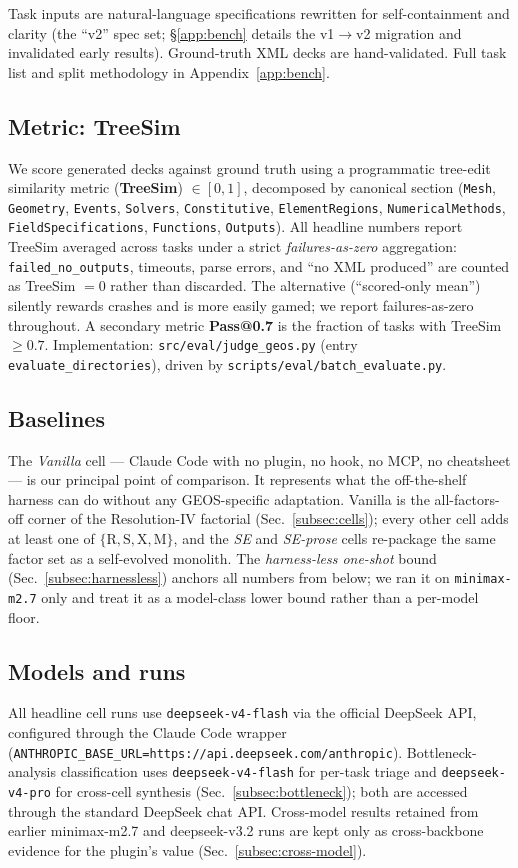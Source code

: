 \documentclass{article}
\begin{document}
Task inputs are natural-language specifications rewritten for self-containment and clarity (the ``v2'' spec set; \S\ref{app:bench} details the v1$\rightarrow$v2 migration and invalidated early results). Ground-truth XML decks are hand-validated. Full task list and split methodology in Appendix~\ref{app:bench}.

\subsection{Metric: TreeSim}
\label{subsec:metric}
We score generated decks against ground truth using a programmatic tree-edit similarity metric (\textbf{TreeSim}) $\in [0, 1]$, decomposed by canonical section (\texttt{Mesh}, \texttt{Geometry}, \texttt{Events}, \texttt{Solvers}, \texttt{Constitutive}, \texttt{ElementRegions}, \texttt{NumericalMethods}, \texttt{FieldSpecifications}, \texttt{Functions}, \texttt{Outputs}). All headline numbers report TreeSim averaged across tasks under a strict \emph{failures-as-zero} aggregation: \texttt{failed\_no\_outputs}, timeouts, parse errors, and ``no XML produced'' are counted as TreeSim $= 0$ rather than discarded. The alternative (``scored-only mean'') silently rewards crashes and is more easily gamed; we report failures-as-zero throughout. A secondary metric \textbf{Pass@0.7} is the fraction of tasks with TreeSim $\geq 0.7$. Implementation: \texttt{src/eval/judge\_geos.py} (entry \texttt{evaluate\_directories}), driven by \texttt{scripts/eval/batch\_evaluate.py}.

\subsection{Baselines}
\label{subsec:baselines}
The \emph{Vanilla} cell --- Claude Code with no plugin, no hook, no MCP, no cheatsheet --- is our principal point of comparison. It represents what the off-the-shelf harness can do without any GEOS-specific adaptation. Vanilla is the all-factors-off corner of the Resolution-IV factorial (Sec.~\ref{subsec:cells}); every other cell adds at least one of $\{\mathrm{R, S, X, M}\}$, and the \emph{SE} and \emph{SE-prose} cells re-package the same factor set as a self-evolved monolith. The \emph{harness-less one-shot} bound (Sec.~\ref{subsec:harnessless}) anchors all numbers from below; we ran it on \texttt{minimax-m2.7} only and treat it as a model-class lower bound rather than a per-model floor.

\subsection{Models and runs}
All headline cell runs use \texttt{deepseek-v4-flash} via the official DeepSeek API, configured through the Claude Code wrapper (\texttt{ANTHROPIC\_BASE\_URL=https://api.deepseek.com/anthropic}). Bottleneck-analysis classification uses \texttt{deepseek-v4-flash} for per-task triage and \texttt{deepseek-v4-pro} for cross-cell synthesis (Sec.~\ref{subsec:bottleneck}); both are accessed through the standard DeepSeek chat API. Cross-model results retained from earlier minimax-m2.7 and deepseek-v3.2 runs are kept only as cross-backbone evidence for the plugin's value (Sec.~\ref{subsec:cross-model}).
\end{document}
